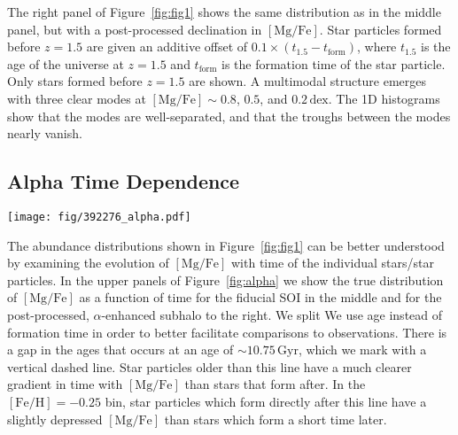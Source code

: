 \documentclass[linenumbers, twocolumn]{aastex631}
\newcommand{\Gyr}{\ensuremath{\textrm{Gyr}}}
\newcommand{\FeH}{\ensuremath{[\textrm{Fe}/\textrm{H}]}}
\newcommand{\MgFe}{\ensuremath{[\textrm{Mg}/\textrm{Fe}]}}
\newcommand{\dex}{\ensuremath{\textrm{dex}}}
\begin{document}
The right panel of Figure~\ref{fig:fig1} shows the same distribution as in the middle panel, but with a post-processed declination in \MgFe{}. Star particles formed before $z=1.5$ are given an additive offset of $0.1\times\left(t_{1.5}-t_{\textrm{form}}\right)$, where $t_{1.5}$ is the age of the universe at $z=1.5$ and $t_{\textrm{form}}$ is the formation time of the star particle. Only stars formed before $z=1.5$ are shown. A multimodal structure emerges with three clear modes at $\MgFe\sim0.8$, $0.5$, and $0.2\,\dex$. The 1D histograms show that the modes are well-separated, and that the troughs between the modes nearly vanish.

\subsection{Alpha Time Dependence}\label{ssec:alpha_time}

\begin{figure*}
  \centering
  \texttt{[image: fig/392276\_alpha.pdf]}
  \caption{\textbf{Bimodality in the abundance plane is linked to distinct epochs in simulation.} The upper panels show \MgFe{} as a function of age for our subhalo in TNG. The colors indicate stellar populations at fixed values of \FeH{}, which are the same as in Figure~\ref{fig:fig1}. A gap in the relation occurs at an age of approximately $10.75\,\Gyr$, which we indicate with a vertical dashed line. The effect of the $\alpha$-enhancement is clear, as it more clearly separates the stars that form before and after this gap in ages (star particles which formed before $z=1.5$ are $\alpha$-enhanced, which occurs at an age of $\sim9.5\,\Gyr$). The lower panels show on the left the Milky Way and on the center and right the data from TNG but with $10\%$ age errors and $0.01\,\dex$ errors in \MgFe{}. When the simulations are given these errors, we see that the before and after star particles smear such that the two populations significantly overlap in ages. This feature more closely resembles the Milky Way, which displays such populations where the bimodality is strongest -- $\FeH=-0.5$ (blue) and $-0.25$ (orange).}
  \label{fig:alpha}
\end{figure*}

The abundance distributions shown in Figure~\ref{fig:fig1} can be better understood by examining the evolution of \MgFe{} with time of the individual stars/star particles. In the upper panels of Figure~\ref{fig:alpha} we show the true distribution of \MgFe{} as a function of time for the fiducial SOI in the middle and for the post-processed, $\alpha$-enhanced subhalo to the right. We split  We use age instead of formation time in order to better facilitate comparisons to observations. There is a gap in the ages that occurs at an age of  $\sim10.75\,\Gyr$, which we mark with a vertical dashed line. Star particles older than this line have a much clearer gradient in time with \MgFe{} than stars that form after. In the $\FeH=-0.25$ bin, star particles which form directly after this line have a slightly depressed \MgFe{} than stars which form a short time later.
\end{document}
